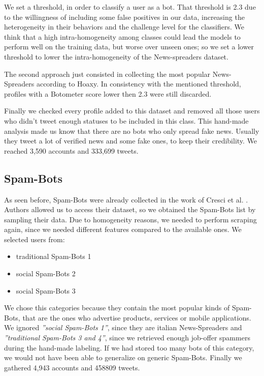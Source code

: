 We set a threshold, in order to classify a user as a bot. That threshold is 2.3 due to the willingness of including some false positives in our data, increasing the heterogeneity in their behaviors and the challenge level for the classifiers. We think that a high intra-homogeneity among classes could lead the models to perform well on the training data, but worse over unseen ones; so we set a lower threshold to lower the intra-homogeneity of the News-spreaders dataset.

The second approach just consisted in collecting the most popular News-Spreaders according to Hoaxy. In consistency with the mentioned threshold, profiles with a Botometer score lower then 2.3 were still discarded.

Finally we checked every profile added to this dataset and removed all those users who didn't tweet enough statuses to be included in this class. This hand-made analysis made us know that there are no bots who only spread fake news. Usually they tweet a lot of verified news and some fake ones, to keep their credibility.
We reached 3,590 accounts and 333,699 tweets.

\subsection{Spam-Bots}
As seen before, Spam-Bots were already collected in the work of Cresci et al. \cite{Cresci}. Authors allowed us to access their dataset, so we obtained the Spam-Bots list by sampling their data. Due to homogeneity reasons, we needed to perform scraping again, since we needed different features compared to the available ones.
We selected users from:
\begin{itemize}
	\item[\PencilRight]traditional Spam-Bots 1
	\item[\PencilRight]social Spam-Bots 2
	\item[\PencilRight]social Spam-Bots 3
\end{itemize}

We chose this categories because they contain the most popular kinds of Spam-Bots, that are the ones who advertise products, services or mobile applications. We ignored \emph{''social Spam-Bots 1''}, since they are italian News-Spreaders and \emph{''traditional Spam-Bots 3 and 4''}, since we retrieved enough job-offer spammers during the hand-made labeling. If we had stored too many bots of this category, we would not have been able to generalize on generic Spam-Bots. Finally we gathered 4,943 accounts and 458809 tweets.

